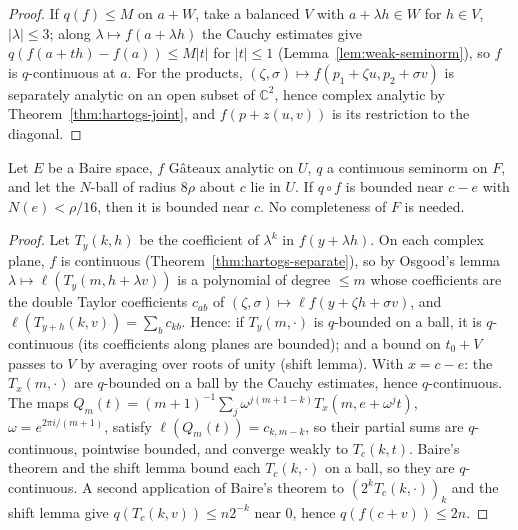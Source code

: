 \begin{proof}
  \leanok
  If $q(f) \le M$ on $a + W$, take a balanced $V$ with $a + \lambda h \in W$ for $h \in V$,
  $|\lambda| \le 3$; along $\lambda \mapsto f(a + \lambda h)$ the Cauchy estimates give
  $q(f(a + t h) - f(a)) \le M |t|$ for $|t| \le 1$ (Lemma~\ref{lem:weak-seminorm}), so $f$ is
  $q$-continuous at $a$. For the products, $(\zeta, \sigma) \mapsto f(p_1 + \zeta u, p_2 + \sigma v)$
  is separately analytic on an open subset of $\mathbb{C}^2$, hence complex analytic by
  Theorem~\ref{thm:hartogs-joint}, and $f(p + z(u, v))$ is its restriction to the diagonal.
\end{proof}

\begin{theorem}
  \label{thm:zorn}
  \leanok
  Let $E$ be a Baire space, $f$ Gâteaux analytic on $U$, $q$ a continuous seminorm on $F$, and
  let the $N$-ball of radius $8\rho$ about $c$ lie in $U$. If $q \circ f$ is bounded near $c - e$
  with $N(e) < \rho/16$, then it is bounded near $c$. No completeness of $F$ is needed.
\end{theorem}

\begin{proof}
  \leanok
  Let $T_y(k, h)$ be the coefficient of $\lambda^k$ in $f(y + \lambda h)$. On each complex plane,
  $f$ is continuous (Theorem~\ref{thm:hartogs-separate}), so by Osgood's lemma
  $\lambda \mapsto \ell(T_y(m, h + \lambda v))$ is a polynomial of degree $\le m$ whose coefficients
  are the double Taylor coefficients $c_{ab}$ of $(\zeta, \sigma) \mapsto \ell f(y + \zeta h + \sigma v)$,
  and $\ell(T_{y+h}(k, v)) = \sum_b c_{kb}$. Hence: if $T_y(m, \cdot)$ is $q$-bounded on a ball, it is
  $q$-continuous (its coefficients along planes are bounded); and a bound on $t_0 + V$ passes to
  $V$ by averaging over roots of unity (shift lemma). With $x = c - e$: the $T_x(m, \cdot)$ are
  $q$-bounded on a ball by the Cauchy estimates, hence $q$-continuous. The maps
  $Q_m(t) = (m+1)^{-1} \sum_j \omega^{j(m+1-k)} T_x(m, e + \omega^j t)$, $\omega = e^{2\pi i/(m+1)}$,
  satisfy $\ell(Q_m(t)) = c_{k, m-k}$, so their partial sums are $q$-continuous, pointwise
  bounded, and converge weakly to $T_c(k, t)$. Baire's theorem and the shift lemma bound each
  $T_c(k, \cdot)$ on a ball, so they are $q$-continuous. A second application of Baire's
  theorem to $(2^k T_c(k, \cdot))_k$ and the shift lemma give $q(T_c(k, v)) \le n 2^{-k}$ near $0$,
  hence $q(f(c + v)) \le 2n$.
\end{proof}

